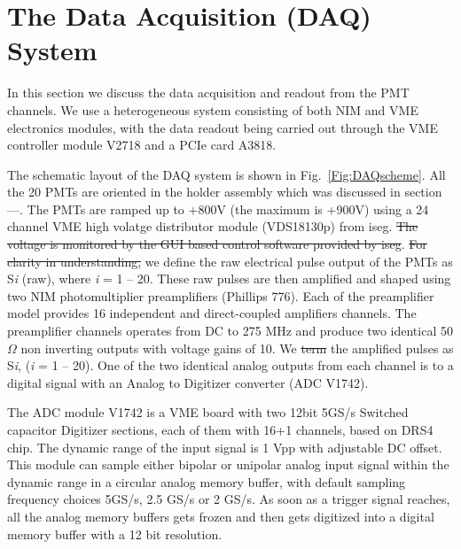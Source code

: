 \section{The Data Acquisition (DAQ) System }
\label{sec:DAQ}

{}

In this section we discuss the data acquisition and readout from the PMT 
channels. We use a heterogeneous system consisting of both 
NIM and VME electronics modules, with the data readout being carried out through 
the VME controller module V2718 and a PCIe card A3818. 

The schematic layout 
of the DAQ system is shown in Fig.~{\ref{Fig:DAQscheme}}. All the 20 PMTs 
are oriented in the holder assembly which was discussed in section---. 
The PMTs are ramped up to +800V (the maximum is +900V) using a 24 channel 
VME high volatge distributor module (VDS18130p) from iseg. \sout{The voltage is 
monitored by the GUI based control software provided by iseg}. 
\sout{For clarity in understanding,} we define the raw electrical pulse output of the PMTs as S{\it i} (raw), where {\it i} = 1 -- 20. These raw pulses are then 
amplified and shaped using two NIM photomultiplier preamplifiers (Phillips 776). 
Each of the preamplifier model provides 16 independent  and direct-coupled 
amplifiers channels. The preamplifier channels operates from DC to 275 MHz and 
produce two identical 50 $\Omega$ non inverting outputs with voltage gains of 10. 
We \sout{term}  the amplified pulses as S{\it i}, ({\it i} = 1 -- 20). One of the 
two identical analog outputs from each channel is  to a digital 
signal with an Analog to Digitizer converter (ADC V1742). 

The ADC module V1742 
is a VME board with two 12bit 5GS/s Switched capacitor Digitizer sections, 
each of them with 16+1 channels, based on DRS4 chip. The dynamic range of the input 
signal is 1 Vpp with adjustable DC offset. This module can sample either bipolar or 
unipolar analog input signal within the dynamic range in a circular 
analog memory buffer, with default sampling frequency choices 5GS/s, 2.5 GS/s 
or 2 GS/s. As soon as a trigger signal reaches, all the analog memory 
buffers gets frozen and then gets digitized into a digital memory buffer 
with a 12 bit resolution. 

